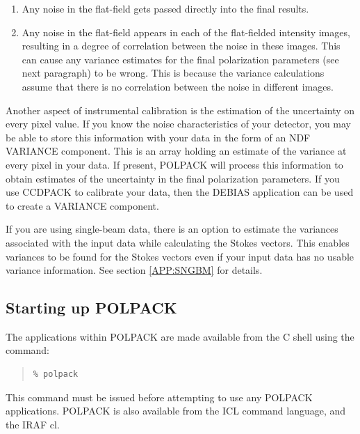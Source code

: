 \documentclass[twoside,11pt]{article}
\newcommand{\hyperref}[4]{#2\ref{#4}#3}
\newcommand{\xref}[3]{#1}
\newcommand{\xlabel}[1]{}
\renewcommand{\_}{\texttt{\symbol{95}}}
\newenvironment{myquote}{\begin{quote}\begin{small}}{\end{small}\end{quote}}
\begin{document}
\begin{enumerate}
\item Any noise in the flat-field gets passed directly into the final results.
\item Any noise in the flat-field appears in each of the flat-fielded
intensity images, resulting in a degree of correlation between the noise in 
these images. This can cause any variance estimates for the final
polarization parameters (see next paragraph) to be wrong. This is because 
the variance calculations assume that there is no correlation between the 
noise in different images. 
\end{enumerate}

Another aspect of instrumental calibration is the estimation of the
uncertainty on every pixel value. If you know the noise characteristics
of your detector, you may be able to store this information with your
data in the form of an NDF VARIANCE component. This is an array
holding an estimate of the variance at every pixel in your data. If
present, POLPACK will process this information to obtain estimates of the
uncertainty in the final polarization parameters. If you use CCDPACK to
calibrate your data, then the \xref{DEBIAS}{sun139}{DEBIAS} application
can be used to create a VARIANCE component.

If you are using single-beam data, there is an option to estimate the 
variances associated with the input data while calculating the Stokes 
vectors.
This enables variances to be found for the Stokes vectors even if your 
input data has no usable variance information. \hyperref{Go here}{See section }
{}{APP:SNGBM} for details.

\subsection{\label{SEC:START}\xlabel{startup}Starting up POLPACK}

The applications within POLPACK are made available from the C shell using the 
command:
\begin{myquote}
\begin{verbatim}
% polpack
\end{verbatim}
\end{myquote}

This command must be issued before attempting to use any POLPACK
applications. POLPACK is also available from the \xref{ICL}{sg5}{}
 command language, and the IRAF cl.
\end{document}
